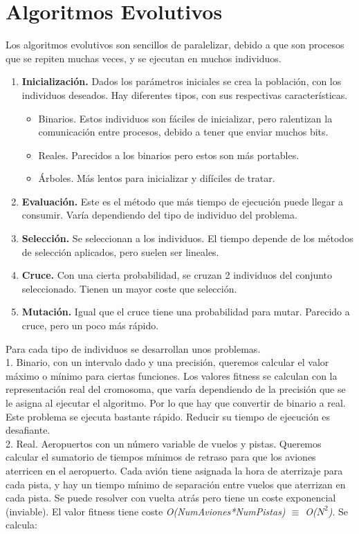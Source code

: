 	\newpage
	


\section{Algoritmos Evolutivos}
	Los algoritmos evolutivos son sencillos de paralelizar, debido a que son procesos que se repiten muchas veces, y se ejecutan en muchos individuos.
	
	\begin{enumerate}
		\item \textbf{Inicialización.} Dados los parámetros iniciales se crea la población, con los individuos deseados. Hay diferentes tipos, con sus respectivas características.
		\begin{itemize}
			\item Binarios. Estos individuos son fáciles de inicializar, pero ralentizan la comunicación entre procesos, debido a tener que enviar muchos bits.
			\item Reales. Parecidos a los binarios pero estos son más portables.
			\item Árboles. Más lentos para inicializar y difíciles de tratar.
		\end{itemize}
		
		\item \textbf{Evaluación.} Este es el método que más tiempo de ejecución puede llegar a consumir. Varía dependiendo del tipo de individuo del problema.
		
		\item \textbf{Selección.} Se seleccionan a los individuos. El tiempo depende de los métodos de selección aplicados, pero suelen ser lineales.
		
		\item \textbf{Cruce.} Con una cierta probabilidad, se cruzan 2 individuos del conjunto seleccionado. Tienen un mayor coste que selección.
		
		\item \textbf{Mutación.} Igual que el cruce tiene una probabilidad para mutar. Parecido a cruce, pero un poco más rápido.
	\end{enumerate}
	
	Para cada tipo de individuos se desarrollan unos problemas.\\
	1. Binario, con un intervalo dado y una precisión, queremos calcular el valor máximo o mínimo para ciertas funciones. Los valores fitness se calculan con la representación real del cromosoma, que varía dependiendo de la precisión que se le asigna al ejecutar el algoritmo. Por lo que hay que convertir de binario a real.
	Este problema se ejecuta bastante rápido. Reducir su tiempo de ejecución es desafiante.\\
	2. Real. Aeropuertos con un número variable de vuelos y pistas. Queremos calcular el sumatorio de tiempos mínimos de retraso para que los aviones aterricen en el aeropuerto. Cada avión tiene asignada la hora de aterrizaje para cada pista, y hay un tiempo mínimo de separación entre vuelos que aterrizan en cada pista. Se puede resolver con vuelta atrás pero tiene un coste exponencial (inviable). El valor fitness tiene coste \textit{O(NumAviones*NumPistas) $\equiv$ O(\(N^{2}\))}. Se calcula:
	
